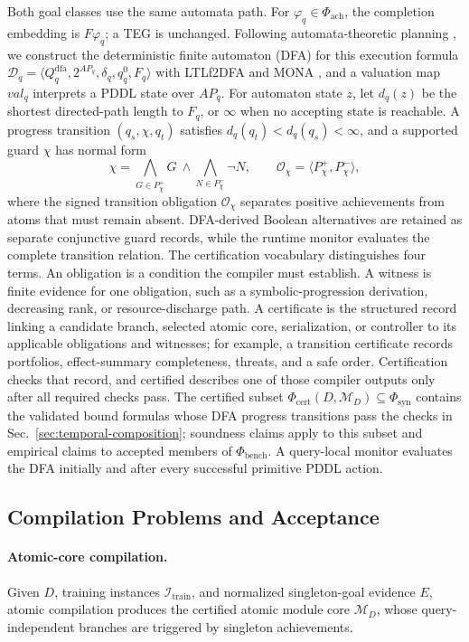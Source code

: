 Both goal classes use the same automata path. For
$\varphi_q\in\Phi_{\mathrm{ach}}$, the completion embedding is $F\varphi_q$; a
TEG is unchanged. Following automata-theoretic planning
\cite{DeGiacomoRubin2018AutomataFOND}, we construct the deterministic finite
automaton (DFA) for this execution formula
$\mathcal D_q=\langle Q_q^{\mathrm{dfa}},2^{AP_q},\delta_q,q_q^0,F_q\rangle$
with LTLf2DFA and MONA \cite{Fuggitti2020LTLf2DFA,Henriksen1995MONA}, and a
valuation map $\mathit{val}_q$ interprets a PDDL state over $AP_q$. For
automaton state $z$, let $d_q(z)$ be the shortest directed-path length to
$F_q$, or $\infty$ when no accepting state is reachable. A progress transition
$(q_s,\chi,q_t)$ satisfies $d_q(q_t)<d_q(q_s)<\infty$, and a supported guard
$\chi$ has normal form
\[
\chi=
\bigwedge_{G\in P_\chi^+}G\ \land\!
\bigwedge_{N\in P_\chi^-}\neg N,
\qquad
\mathcal O_\chi=\langle P_\chi^+,P_\chi^-\rangle,
\]
where the signed transition obligation $\mathcal O_\chi$ separates positive
achievements from atoms that must remain absent. DFA-derived Boolean alternatives
are retained as separate conjunctive guard records, while the runtime monitor
evaluates the complete transition relation. The certification vocabulary
distinguishes four terms.
An obligation is a condition the compiler must establish. A witness is finite
evidence for one obligation, such as a symbolic-progression derivation,
decreasing rank, or resource-discharge path. A certificate is the structured
record linking a candidate branch, selected atomic core, serialization, or
controller to its applicable obligations and witnesses;
for example, a transition certificate records portfolios, effect-summary
completeness, threats, and a safe order. Certification checks that record, and
certified describes one of those compiler outputs only after all required checks
pass. The certified subset
$\Phi_{\mathrm{cert}}(D,\mathcal M_D)\subseteq\Phi_{\mathrm{syn}}$ contains the
validated bound formulas whose DFA progress transitions pass the checks in
Sec.~\ref{sec:temporal-composition}; soundness claims apply to this subset and
empirical claims to accepted members of $\Phi_{\mathrm{bench}}$.
A query-local monitor evaluates the DFA initially and after every successful
primitive PDDL action.

\subsection{Compilation Problems and Acceptance}

\paragraph{Atomic-core compilation.}
Given $D$, training instances
$\mathcal{I}_{\mathrm{train}}$, and normalized singleton-goal evidence $E$,
atomic compilation produces the certified atomic module core $\mathcal{M}_D$,
whose query-independent branches are triggered by singleton achievements.

